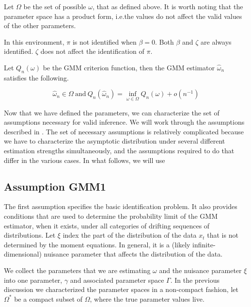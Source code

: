 \documentclass[11pt]{article}
\begin{document}
Let $\Omega$ be the set of possible $\omega$, that as defined above.
It is worth noting that the parameter space has a product form, i.e.\@ the values do not affect the valid values
of the other parameters.

In this environment, $\pi$ is not identified when $\beta = 0$.
Both $\beta$ and $\zeta$ are always identified.
$\zeta$ does not affect the identification of $\pi$.

Let $Q_n(\omega)$ be the GMM criterion function, then the GMM estimator $\hat{\omega}_n$ satisfies the following.


\begin{equation}
    \hat{\omega}_n \in \Omega\ \text{and}\ Q_n(\hat{\omega}_n) = \inf_{\omega \in \Omega} Q_n(\omega) +
    o\left(n^{-1}\right) 
\end{equation}


Now that we have defined the parameters, we can characterize the set of assumptions necessary for valid inference.
We will work through the assumptions described in \textcite{andrewsGmm2014}.
The set of necessary assumptions is relatively complicated because we have to characterize the asymptotic
distribution under several different estimation strengths simultaneously, and the assumptions required to do that
  differ in the various cases. 
In what follows, we will use 

\subsection{Assumption GMM1\label{Section GMM}}

The first assumption specifies the basic identification
problem. It also provides conditions that are used to determine the
probability limit of the GMM estimator, when it exists, under all categories
of drifting sequences of distributions.
Let $\xi$ index the part of the distribution of the data $x_t$ that is not determined by the moment equations.
In general, it is a (likely infinite-dimensional) nuisance parameter that affects the distribution of the data. 


We collect the parameters that we are estimating $\omega$ and the nuisance parameter $\xi$ into one parameter,
$\gamma$ and associated parameter space $\Gamma$.
In the previous discussion we characterized the parameter spaces in a non-compact fashion, let $\Omega^{*}$ be a
compact subset of $\Omega$, where the true parameter values live.
\end{document}
